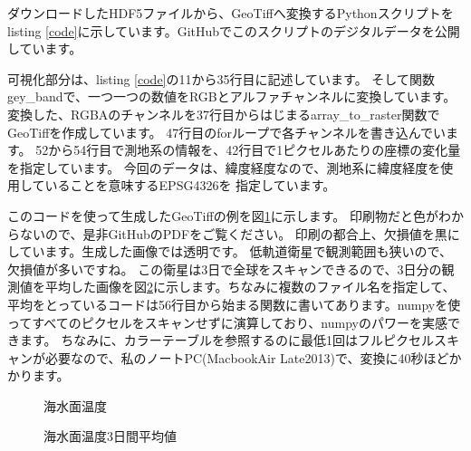 ダウンロードしたHDF5ファイルから、GeoTiffへ変換するPythonスクリプトをlisting \ref{code}に示しています。GitHubでこのスクリプトのデジタルデータを公開しています。

可視化部分は、listing \ref{code}の11から35行目に記述しています。
そして関数gey\_bandで、一つ一つの数値をRGBとアルファチャンネルに変換しています。
変換した、RGBAのチャンネルを37行目からはじまるarray\_to\_raster関数でGeoTiffを作成しています。
47行目のforループで各チャンネルを書き込んでいます。
52から54行目で測地系の情報を、42行目で1ピクセルあたりの座標の変化量を指定しています。
今回のデータは、緯度経度なので、測地系に緯度経度を使用していることを意味するEPSG4326を
指定しています。

このコードを使って生成したGeoTiffの例を図\ref{fig:sst}に示します。
印刷物だと色がわからないので、是非GitHubのPDFをご覧ください。
印刷の都合上、欠損値を黒にしています。生成した画像では透明です。
低軌道衛星で観測範囲も狭いので、欠損値が多いですね。
この衛星は3日で全球をスキャンできるので、3日分の観測値を平均した画像を図\ref{fig:sst-ave}に示します。ちなみに複数のファイル名を指定して、平均をとっているコードは56行目から始まる関数に書いてあります。numpyを使ってすべてのピクセルをスキャンせずに演算しており、numpyのパワーを実感できます。
ちなみに、カラーテーブルを参照するのに最低1回はフルピクセルスキャンが必要なので、私のノートPC(MacbookAir Late2013)で、変換に40秒ほどかかります。


\begin{figure}[t]
\centering
{}
\caption{海水面温度}
\label{fig:sst}
\end{figure}

\begin{figure}[t]
\centering
{}
\caption{海水面温度3日間平均値}
\label{fig:sst-ave}
\end{figure}
